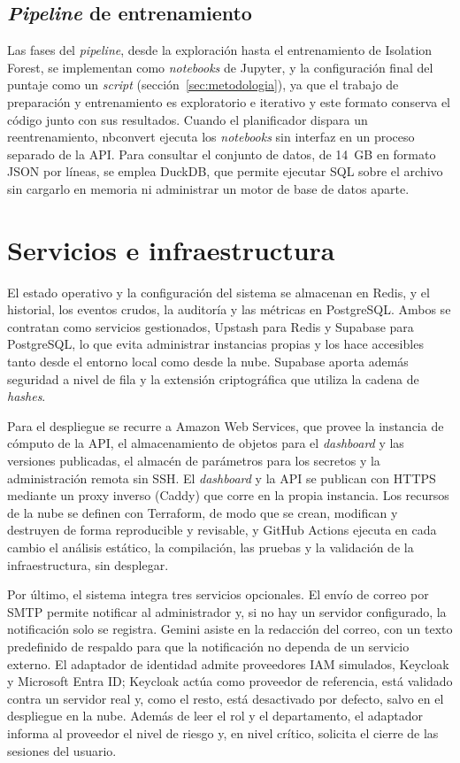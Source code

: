 \subsection{\emph{Pipeline} de entrenamiento}
Las fases del \emph{pipeline}, desde la exploración hasta el entrenamiento de Isolation Forest, se implementan como \emph{notebooks} de Jupyter, y la configuración final del puntaje como un \emph{script} (sección~\ref{sec:metodologia}), ya que el trabajo de preparación y entrenamiento es exploratorio e iterativo y este formato conserva el código junto con sus resultados. Cuando el planificador dispara un reentrenamiento, nbconvert ejecuta los \emph{notebooks} sin interfaz en un proceso separado de la API. Para consultar el conjunto de datos, de 14~GB en formato JSON por líneas, se emplea DuckDB, que permite ejecutar SQL sobre el archivo sin cargarlo en memoria ni administrar un motor de base de datos aparte.

\section{Servicios e infraestructura}
\label{sec:servicios}
El estado operativo y la configuración del sistema se almacenan en Redis, y el historial, los eventos crudos, la auditoría y las métricas en PostgreSQL. Ambos se contratan como servicios gestionados, Upstash para Redis y Supabase para PostgreSQL, lo que evita administrar instancias propias y los hace accesibles tanto desde el entorno local como desde la nube. Supabase aporta además seguridad a nivel de fila y la extensión criptográfica que utiliza la cadena de \emph{hashes}.

Para el despliegue se recurre a Amazon Web Services, que provee la instancia de cómputo de la API, el almacenamiento de objetos para el \emph{dashboard} y las versiones publicadas, el almacén de parámetros para los secretos y la administración remota sin SSH. El \emph{dashboard} y la API se publican con HTTPS mediante un proxy inverso (Caddy) que corre en la propia instancia. Los recursos de la nube se definen con Terraform, de modo que se crean, modifican y destruyen de forma reproducible y revisable, y GitHub Actions ejecuta en cada cambio el análisis estático, la compilación, las pruebas y la validación de la infraestructura, sin desplegar.

Por último, el sistema integra tres servicios opcionales. El envío de correo por SMTP permite notificar al administrador y, si no hay un servidor configurado, la notificación solo se registra. Gemini asiste en la redacción del correo, con un texto predefinido de respaldo para que la notificación no dependa de un servicio externo. El adaptador de identidad admite proveedores IAM simulados, Keycloak y Microsoft Entra ID; Keycloak actúa como proveedor de referencia, está validado contra un servidor real y, como el resto, está desactivado por defecto, salvo en el despliegue en la nube. Además de leer el rol y el departamento, el adaptador informa al proveedor el nivel de riesgo y, en nivel crítico, solicita el cierre de las sesiones del usuario.

